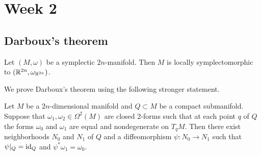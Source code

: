 \documentclass{amsart}
\begin{document}
\newpage
\section{Week 2}

\subsection{Darboux's theorem}

\begin{theorem}[Darboux]
    Let $(M,\omega)$ be a symplectic $2n$-manifold. Then $M$ is locally symplectomorphic to
    $(\mathbb{R}^{2n},\omega_{\mathbb{R}^{2n}})$.
\end{theorem}

We prove Darboux's theorem using the following stronger statement.

\begin{theorem}
    Let $M$ be a $2n$-dimensional manifold and $Q\subset M$ be a compact submanifold. Suppose that
    $\omega_1,\omega_2\in\Omega^2(M)$ are closed 2-forms such that at each point $q$ of $Q$ the forms
    $\omega_0$ and $\omega_1$ are equal and nondegenerate on $T_qM$. Then there exist neighborhoods
    $N_0$ and $N_1$ of $Q$ and a diffeomorphism $\psi:N_0\to N_1$ such that $\psi|_Q=\operatorname{id}_Q$ and
    $\psi^*\omega_1=\omega_0$.
\end{theorem}
\end{document}
